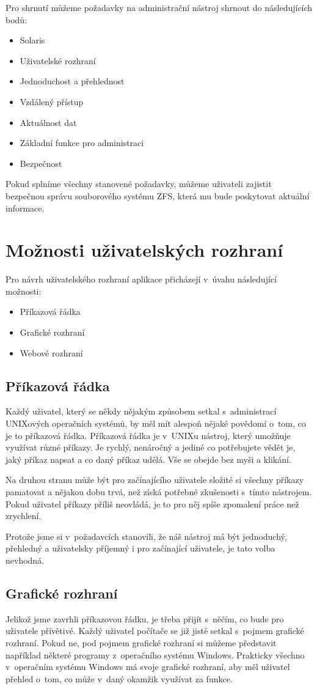 Pro shrnutí můžeme požadavky na administrační nástroj shrnout do následujících bodů:
\begin{itemize}
    \item Solaris
    \item Uživatelské rozhraní
    \item Jednoduchost a přehlednost
    \item Vzdálený přístup
    \item Aktuálnost dat
    \item Základní funkce pro administraci
    \item Bezpečnost
\end{itemize}

Pokud splníme všechny stanovené požadavky, můžeme uživateli zajistit bezpečnou správu souborového systému ZFS, která mu bude poskytovat aktuální informace.
\section{Možnosti uživatelských rozhraní}
Pro návrh uživatelského rozhraní aplikace přicházejí v~úvahu následující možnosti:
\begin{itemize}
  \item Příkazová řádka
  \item Grafické rozhraní
  \item Webové rozhraní
\end{itemize}
    \subsection{Příkazová řádka}
    Každý uživatel, který se někdy nějakým způsobem setkal s~administrací UNIXových operačních systémů, by měl mít alespoň nějaké povědomí o~tom, co je to příkazová řádka. Příkazová řádka je v~UNIXu nástroj, který umožňuje využívat různé příkazy. Je rychlý, nenáročný a jediné co potřebujete vědět je, jaký příkaz napsat a co daný příkaz udělá. Vše se obejde bez myši a klikání.

    Na druhou stranu může být pro začínajícího uživatele složité si všechny příkazy pamatovat a nějakou dobu trvá, než získá potřebné zkušenosti s~tímto nástrojem. Pokud uživatel příkazy příliš neovládá, je to pro něj spíše zpomalení práce než zrychlení.

    Protože jsme si v~požadavcích stanovili, že náš nástroj má být jednoduchý, přehledný a uživatelsky příjemný i pro začínající uživatele, je tato volba nevhodná.
    \subsection{Grafické rozhraní}
    Jelikož jsme zavrhli příkazovou řádku, je třeba přijít s~něčím, co bude pro uživatele přívětivé. Každý uživatel počítače se již jistě setkal s~pojmem grafické rozhraní. Pokud ne, pod pojmem grafické rozhraní si můžeme představit například některé programy z~operačního systému Windows. Prakticky všechno v~operačním systému Windows má svoje grafické rozhraní, aby měl uživatel přehled o~tom, co může v~daný okamžik využívat za funkce.

